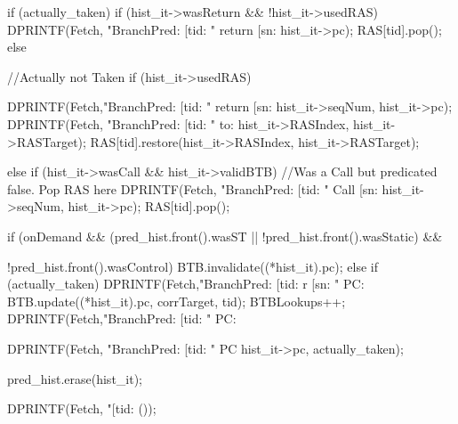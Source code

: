 \begin{DoxyCode}
{{        if (actually_taken) {
            if (hist_it->wasReturn && !hist_it->usedRAS) {
                 DPRINTF(Fetch, "BranchPred: [tid: %
                           "  return [sn:%
                            hist_it->pc);
                 RAS[tid].pop();
            }
        } else {
           //Actually not Taken
           if (hist_it->usedRAS) {
                DPRINTF(Fetch,"BranchPred: [tid: %
                           "  return [sn:%
                           hist_it->seqNum, hist_it->pc);
                DPRINTF(Fetch, "BranchPred: [tid:%
                               " to: %
                              hist_it->RASIndex, hist_it->RASTarget);
                RAS[tid].restore(hist_it->RASIndex, hist_it->RASTarget);

           } else if (hist_it->wasCall && hist_it->validBTB) {
                 //Was a Call but predicated false. Pop RAS here
                 DPRINTF(Fetch, "BranchPred: [tid: %
                           "  Call [sn:%
                           hist_it->seqNum, hist_it->pc);
                 RAS[tid].pop();
           }
        }
                if (onDemand && 
                    (pred_hist.front().wasST || !pred_hist.front().wasStatic) && 
      
                        !pred_hist.front().wasControl) {
                        BTB.invalidate((*hist_it).pc);
                } else  if (actually_taken) {
                        DPRINTF(Fetch,"BranchPred: [tid: %
      r [sn:%
                          " PC: %
                        BTB.update((*hist_it).pc, corrTarget, tid);
                        BTBLookups++;
            DPRINTF(Fetch,"BranchPred: [tid: %
                            " PC: %
                }

        DPRINTF(Fetch, "BranchPred: [tid:%
                       " PC %
                       hist_it->pc, actually_taken);

        pred_hist.erase(hist_it);

        DPRINTF(Fetch, "[tid:%
      ());
    }
}
\end{DoxyCode}


